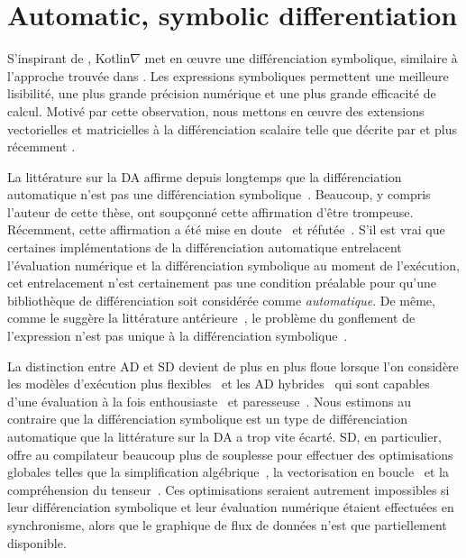 \section{Automatic, symbolic differentiation}\label{sec:ad_vs_sd}

S'inspirant de \citet{mccarthy1960recursive}, Kotlin$\nabla$ met en œuvre une différenciation symbolique, similaire à l'approche trouvée dans \citet[\S 2.56--2.58]{abelson1996structure}. Les expressions symboliques permettent une meilleure lisibilité, une plus grande précision numérique et une plus grande efficacité de calcul. Motivé par cette observation, nous mettons en œuvre des extensions vectorielles et matricielles à la différenciation scalaire telle que décrite par \citet{dwyer1948symbolic} et plus récemment \citet{laue2018computing}.

La littérature sur la DA affirme depuis longtemps que la différenciation automatique n'est pas une différenciation symbolique~\citep{baydin2015survey}. Beaucoup, y compris l'auteur de cette thèse, ont soupçonné cette affirmation d'être trompeuse. Récemment, cette affirmation a été mise en doute~\citep{wang2018demystifying} et réfutée~\citep{laue2019equivalence}. S'il est vrai que certaines implémentations de la différenciation automatique entrelacent l'évaluation numérique et la différenciation symbolique au moment de l'exécution, cet entrelacement n'est certainement pas une condition préalable pour qu'une bibliothèque de différenciation soit considérée comme \textit{automatique}. De même, comme le suggère la littérature antérieure~\citep{baydin2014ad}, le problème du gonflement de l'expression n'est pas unique à la différenciation symbolique~\citep{laue2019equivalence}.

La distinction entre AD et SD devient de plus en plus floue lorsque l'on considère les modèles d'exécution plus flexibles~\citep{wang2018demystifying} et les AD hybrides~\citep{abadi2016tensorflow} qui sont capables d'une évaluation à la fois enthousiaste~\citep{paszke2019pytorch, agrawal2019tensorflow} et paresseuse~\citep{neubig2017dynet, van2018tangent}. Nous estimons au contraire que la différenciation symbolique est un type de différenciation automatique que la littérature sur la DA a trop vite écarté. SD, en particulier, offre au compilateur beaucoup plus de souplesse pour effectuer des optimisations globales telles que la simplification algébrique~\citep{bergstra2010theano}, la vectorisation en boucle~\citep{agarwal2019static} et la compréhension du tenseur~\citep{vasilache2018tensor, laue2020simple}. Ces optimisations seraient autrement impossibles si leur différenciation symbolique et leur évaluation numérique étaient effectuées en synchronisme, alors que le graphique de flux de données n'est que partiellement disponible.

